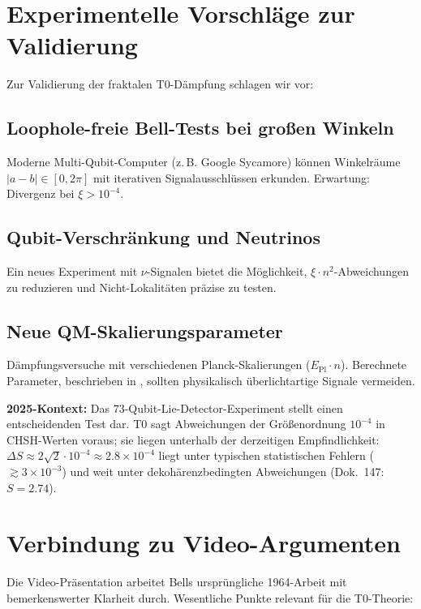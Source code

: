 \section{Experimentelle Vorschläge zur Validierung}
\label{sec:experiments}

Zur Validierung der fraktalen T0-Dämpfung schlagen wir vor:

\subsection{Loophole-freie Bell-Tests bei großen Winkeln}

Moderne Multi-Qubit-Computer (z.\,B. Google Sycamore) können Winkelräume $|a-b| \in [0, 2\pi]$ mit iterativen Signalausschlüssen erkunden. Erwartung: Divergenz bei $\xi > 10^{-4}$.

\subsection{Qubit-Verschränkung und Neutrinos}

Ein neues Experiment mit $\nu$-Signalen bietet die Möglichkeit, $\xi \cdot n^2$-Abweichungen zu reduzieren und Nicht-Lokalitäten präzise zu testen.

\subsection{Neue QM-Skalierungsparameter}

Dämpfungsversuche mit verschiedenen Planck-Skalierungen ($E_{\text{Pl}} \cdot n$). Berechnete Parameter, beschrieben in \cite{keysight2025}, sollten physikalisch überlichtartige Signale vermeiden.

\textbf{2025-Kontext:} Das 73-Qubit-Lie-Detector-Experiment\cite{sciencedaily2025} stellt einen entscheidenden Test dar. T0 sagt Abweichungen der Größenordnung $10^{-4}$ in CHSH-Werten voraus; sie liegen unterhalb der derzeitigen Empfindlichkeit: $\Delta S \approx 2\sqrt{2} \cdot 10^{-4} \approx 2.8 \times 10^{-4}$ liegt unter typischen statistischen Fehlern ($\gtrsim 3 \times 10^{-3}$) und weit unter dekohärenzbedingten Abweichungen (Dok.~147: $S = 2.74$).

\section{Verbindung zu Video-Argumenten}
\label{sec:video_connection}

Die Video-Präsentation\cite{youtube_bell2025} arbeitet Bells ursprüngliche 1964-Arbeit mit bemerkenswerter Klarheit durch. Wesentliche Punkte relevant für die T0-Theorie:

